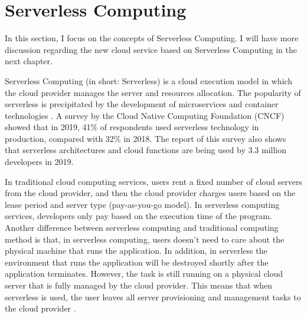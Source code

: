 \section{Serverless Computing}
In this section, I focus on the concepts of Serverless Computing. I will have more discussion regarding the new cloud service based on Serverless Computing in the next chapter.
\par
Serverless Computing (in short: Serverless) is a cloud execution model in which the cloud provider manages the server and resources allocation. 
The popularity of serverless is precipitated by the development of microservices and container technologies \cite{baldini2017serverless}. A survey by the Cloud Native Computing Foundation (CNCF) showed that in 2019, 41\% of respondents used serverless technology in production, compared with 32\% in 2018\cite{cncf2020}. The report of this survey also shows that serverless architectures and cloud functions are being used by 3.3 million developers \cite{cncf2020} in 2019.
\par
In traditional cloud computing services, users rent a fixed number of cloud servers from the cloud provider, and then the cloud provider charges users based on the lease period and server type (pay-as-you-go model). In serverless computing services, developers only pay based on the execution time of the program.
Another difference between serverless computing and traditional computing method is that, in serverless computing, users doesn't need to care about the physical machine that runs the application. In addition, in serverless the environment that runs the application will be destroyed shortly after the application terminates. 
However, the task is still running on a physical cloud server that is fully managed by the cloud provider. This means that when serverless is used, the user leaves all server provisioning and management tasks to the cloud provider \cite{jonas2019cloud}.
